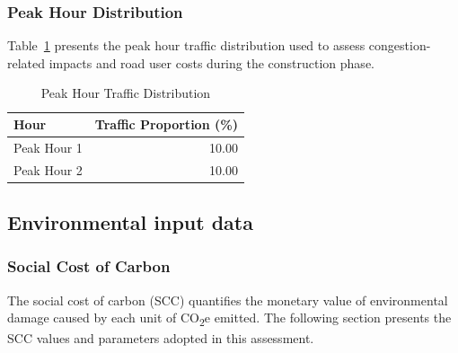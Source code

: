 \documentclass[12pt,a4paper]{article}
\begin{document}
\subsubsection{Peak Hour Distribution}
\noindent Table~\ref{tab:peak_hour_distribution} presents the peak hour traffic distribution used to assess congestion-related impacts and road user costs during the construction phase.

\begin{table}[H]
\centering
\caption{Peak Hour Traffic Distribution}
\label{tab:peak_hour_distribution}
\begin{tabular}{lr}
\toprule
\textbf{Hour} & \textbf{Traffic Proportion (\%)} \\
\midrule
Peak Hour 1 & 10.00 \\
Peak Hour 2 & 10.00 \\
\bottomrule
\end{tabular}
\end{table}


\subsection{Environmental input data}
\subsubsection{Social Cost of Carbon}
\noindent The social cost of carbon (SCC) quantifies the monetary value of environmental damage caused by each unit of CO\textsubscript{2}e emitted. The following section presents the SCC values and parameters adopted in this assessment.
\end{document}
